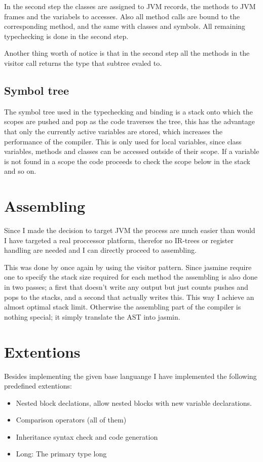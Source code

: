 \documentclass[a4paper,11pt]{article}
\begin{document}
   In the second step the classes are assigned to JVM records, the methods to JVM frames and the variabels to accesses. Also all method calls are bound to the corresponding method, and the same with classes and symbols.
   All remaining typechecking is done in the second step.

   Another thing worth of notice is that in the second step all the methods in the visitor call returns the type that subtree evaled to.

   \subsection{Symbol tree}
   The symbol tree used in the typechecking and binding is a stack onto which the scopes are pushed and pop as the code traverses the tree, this has the advantage that only the currently active variables are
   stored, which increases the performance of the compiler. This is only used for local variables, since class variables, methods and classes can be accessed outside of their scope. If a variable is not found in a scope
   the code proceeds to check the scope below in the stack and so on.

   \section{Assembling}
   Since I made the decision to target JVM the process are much easier than would I have targeted a real proccessor platform, therefor no IR-trees or register handling are needed and I can directly proceed to assembling.

   This was done by once again by using the visitor pattern. Since jasmine require one to specify the stack size required for each method the assembling is also done in two passes; a first that doesn't write any output but just counts pushes and pops to the stacks,
   and a second that actually writes this. This way I achieve an almost optimal stack limit. Otherwise the assembling part of the compiler is nothing special; it simply translate the AST into jasmin.

   \section{Extentions}
   Besides implementing the given base languange I have implemented the following predefined extentions:
   \begin{itemize}
      \item Nested block declations, allow nested blocks with new variable declarations.
      \item Comparison operators (all of them)
      \item Inheritance syntax check and code generation
      \item Long: The primary type long
   \end{itemize}
\end{document}
